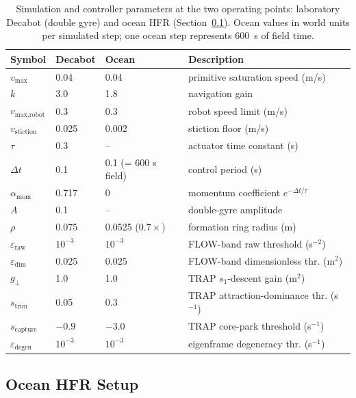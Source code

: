 \documentclass[lettersize,journal]{IEEEtran}
\begin{document}
\begin{table}[!t]
\centering
\caption{Simulation and controller parameters at the two operating
points: laboratory Decabot (double gyre) and ocean HFR
(Section~\ref{sec:ocean_sim}). Ocean values in world units per
simulated step; one ocean step represents 600~s of field time.}
\label{tab:params}
\footnotesize
\setlength{\tabcolsep}{3pt}
\begin{tabular}{llll}
\hline
\textbf{Symbol} & \textbf{Decabot} & \textbf{Ocean} & \textbf{Description} \\
\hline
$v_{\max}$ & 0.04 & 0.04 & primitive saturation speed (m/s) \\
$k$ & 3.0 & 1.8 & navigation gain \\
$v_{\text{max,robot}}$ & 0.3 & 0.3 & robot speed limit (m/s) \\
$v_{\text{stiction}}$ & 0.025 & 0.002 & stiction floor (m/s) \\
$\tau$ & 0.3 & -- & actuator time constant (s) \\
$\Delta t$ & 0.1 & 0.1 (= 600 s field) & control period (s) \\
$\alpha_{\text{mom}}$ & 0.717 & 0 & momentum coefficient $e^{-\Delta t/\tau}$ \\
$A$ & 0.1 & -- & double-gyre amplitude \\
$\rho$ & 0.075 & 0.0525 ($0.7\times$) & formation ring radius (m) \\
$\varepsilon_{\text{raw}}$ & $10^{-3}$ & $10^{-3}$ & FLOW-band raw threshold (s$^{-2}$) \\
$\varepsilon_{\text{dim}}$ & 0.025 & 0.025 & FLOW-band dimensionless thr. (m$^2$) \\
$g_\perp$ & 1.0 & 1.0 & TRAP $s_1$-descent gain (m$^2$) \\
$s_{\text{trim}}$ & 0.05 & 0.3 & TRAP attraction-dominance thr. (s$^{-1}$) \\
$s_{\text{capture}}$ & $-0.9$ & $-3.0$ & TRAP core-park threshold (s$^{-1}$) \\
$\varepsilon_{\text{degen}}$ & $10^{-3}$ & $10^{-3}$ & eigenframe degeneracy thr. (s$^{-1}$) \\
\hline
\end{tabular}
\end{table}

\subsection{Ocean HFR Setup}
\label{sec:ocean_sim}
\end{document}
